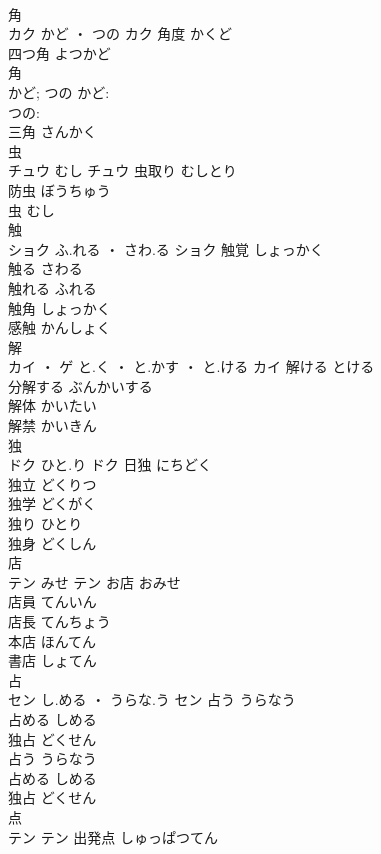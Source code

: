 \documentclass[8pt]{extreport}
\begin{document}
\begin{CJK}{UTF8}{min}
\\	角	
\\	カク	かど ・ つの	カク	角度	かくど	
\\	四つ角	よつかど	
\\	角 
\\	かど; つの	かど: 
\\	つの: 
\\	三角	さんかく	
\\	虫	
\\	チュウ	むし	チュウ	虫取り	むしとり	
\\	防虫	ぼうちゅう	
\\	虫	むし	
\\	触	
\\	ショク	ふ.れる ・ さわ.る	ショク	触覚	しょっかく	
\\	触る	さわる	
\\	触れる	ふれる	
\\	触角	しょっかく	
\\	感触	かんしょく	
\\	解	
\\	カイ ・ ゲ	と.く ・ と.かす ・ と.ける	カイ	解ける	とける	
\\	分解する	ぶんかいする	
\\	解体	かいたい	
\\	解禁	かいきん	
\\	独	
\\	ドク	ひと.り	ドク	日独	にちどく	
\\	独立	どくりつ	
\\	独学	どくがく	
\\	独り	ひとり	
\\	独身	どくしん	
\\	店	
\\	テン	みせ	テン	お店	おみせ	
\\	店員	てんいん	
\\	店長	てんちょう	
\\	本店	ほんてん	
\\	書店	しょてん	
\\	占	
\\	セン	し.める ・ うらな.う	セン	占う	うらなう	
\\	占める	しめる	
\\	独占	どくせん	
\\	占う	うらなう	
\\	占める	しめる	
\\	独占	どくせん	
\\	点	
\\	テン		テン	出発点	しゅっぱつてん	

\end{CJK}
\end{document}
